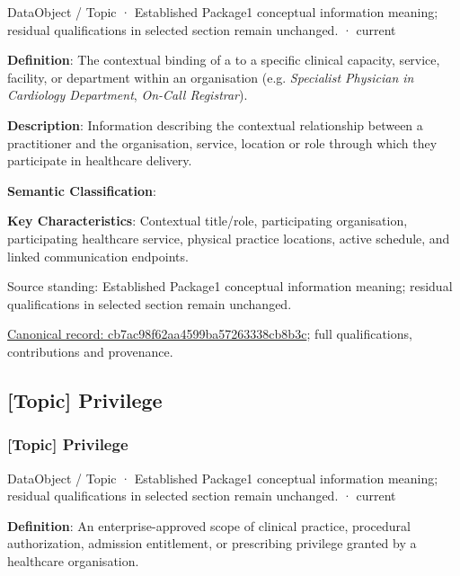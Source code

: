 \label{element:cb7ac98f62aa4599ba57263338cb8b3c}
{\small DataObject / Topic · Established Package1 conceptual information meaning; residual qualifications in selected section remain unchanged. · current}\par

\textbf{Definition}: The contextual binding of a \texttt{} to a specific clinical capacity, service, facility, or department within an organisation (e.g. \emph{Specialist Physician in Cardiology Department}, \emph{On-Call Registrar}).



\textbf{Description}: Information describing the contextual relationship between a practitioner and the organisation, service, location or role through which they participate in healthcare delivery.



\textbf{Semantic Classification}: \texttt{}



\textbf{Key Characteristics}: Contextual title/role, participating organisation, participating healthcare service, physical practice locations, active schedule, and linked communication endpoints.



Source standing: Established Package1 conceptual information meaning; residual qualifications in selected section remain unchanged.


{\footnotesize \href{../../../../continuum/application/data-object/topic/cb7ac98f62aa4599ba57263338cb8b3c.md}{Canonical record: cb7ac98f62aa4599ba57263338cb8b3c}; full qualifications, contributions and provenance.}\par
\subsection{[Topic] Privilege}

\subsubsection{[Topic] Privilege}

\label{element:75e194f6168945588ed30cc6c78d04cc}
{\small DataObject / Topic · Established Package1 conceptual information meaning; residual qualifications in selected section remain unchanged. · current}\par

\textbf{Definition}: An enterprise-approved scope of clinical practice, procedural authorization, admission entitlement, or prescribing privilege granted by a healthcare organisation.



